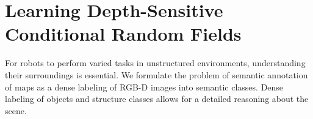 




\chapter{Learning Depth-Sensitive Conditional Random Fields}

For robots to perform varied tasks in unstructured environments, understanding their
surroundings is essential. We formulate the problem of semantic annotation of maps
as a dense labeling of RGB-D images into semantic classes. Dense labeling of objects
and structure classes allows for a detailed reasoning about the scene.

